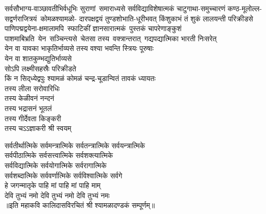 \begin{multicols}{2}
\begin{flushleft}
\medskip
सर्वसौभाग्य-वाञ्छावतीभिर्वधूभिः
सुराणां~समाराध्यसे सर्वविद्याविशेषात्मकं
चाटुगाथा-समुच्चारणं कण्ठ-मूलोल्ल-
सद्वर्णराजित्रयं~कोमळश्यामळो-
दारपक्षद्वयं तुण्डशोभाति-धूरीभवत् 
किंशुकाभं तं शुकं लालयन्ती परिक्रीडसे\\
\medskip
\mbox{पाणिपद्मद्वयेना-क्षमालामपि~स्फाटिकीं}
ज्ञानसारात्मकं~पुस्तकं चापरेणाङ्कुशं
पाशमाबिभ्रति~येन~सञ्चिन्त्यसे~चेतसा 
तस्य~वक्त्रान्तरात्~गद्यपद्यात्मिका
भारती निःसरेत्\\
\medskip
येन वा यावका भाकृतिर्भाव्यसे
तस्य  वश्या भवन्ति स्त्रियः पूरुषाः\\
येन वा शातकुम्भद्युतिर्भाव्यसे\\
सोऽपि लक्ष्मीसहस्रैः परिक्रीडते\\
\medskip
किं न सिद्‌ध्येद्वपुः श्यामळं कोमळं 
चन्द्र-चूडान्वितं तावकं ध्यायतः\\
तस्य लीला सरोवारिधिः\\
तस्य केळीवनं नन्दनं\\
तस्य भद्रासनं भूतलं\\
तस्य गीर्देवता किङ्करी\\
तस्य चऽऽज्ञाकरी श्री स्वयम्\\
\end{flushleft}
\end{multicols}
\begin{center}
सर्वतीर्थात्मिके सर्वमन्त्रात्मिके सर्वतन्त्रात्मिके सर्वयन्त्रात्मिके\\
सर्वपीठात्मिके सर्वसत्त्वात्मिके सर्वशक्त्यात्मिके\\
सर्वविद्यात्मिके सर्वयोगात्मिके सर्वरागात्मिके\\
सर्वशब्दात्मिके सर्ववर्णात्मिके सर्वविश्वात्मिके सर्वगे\\
हे जगन्मातृके पाहि मां पाहि मां पाहि माम् \\
देवि तुभ्यं नमो देवि तुभ्यं नमो देवि तुभ्यं नमः\\
॥इति महाकवि कालिदासविरचितं श्री श्यामळादण्डकं सम्पूर्णम्॥
\end{center}